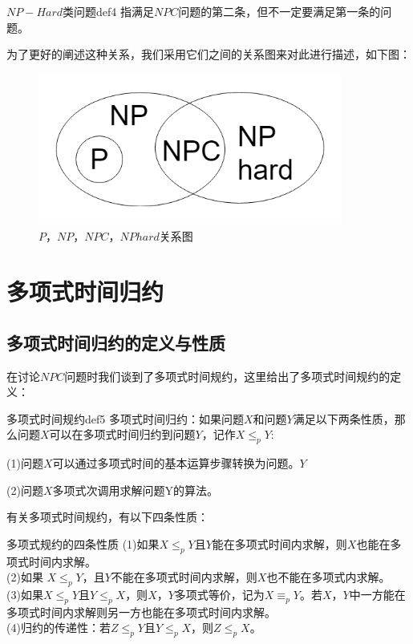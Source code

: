 	\begin{definition}{$NP-Hard$类问题}{def4}
		指满足$NPC$问题的第二条，但不一定要满足第一条的问题。
	\end{definition}
	
	为了更好的阐述这种关系，我们采用它们之间的关系图来对此进行描述，如下图：
	
	\begin{figure}[ht]
		\begin{minipage}[t]{1\linewidth}
			\centering
			\includegraphics[width=10cm,height=5cm]{image/P_NP1.png}
			\caption{$P$，$NP$，$NPC$，$NPhard$关系图}
		\end{minipage}
	\end{figure}
	
	\section{多项式时间归约}
	\subsection{多项式时间归约的定义与性质}
	在讨论$NPC$问题时我们谈到了多项式时间规约，这里给出了多项式时间规约的定义：
	\begin{definition}{多项式时间规约}{def5}
	多项式时间归约：如果问题$X$和问题$Y$满足以下两条性质，那么问题$X$可以在多项式时间归约到问题$Y$，记作$X\leq_pY$:
		
	(1)问题$X$可以通过多项式时间的基本运算步骤转换为问题。$Y$
	
	(2)问题$X$多项式次调用求解问题Y的算法。
	\end{definition}
	有关多项式时间规约，有以下四条性质：
	\begin{theorem}{多项式规约的四条性质}{}
		(1)如果$X\leq_pY$且$Y$能在多项式时间内求解，则$X$也能在多项式时间内求解。\\
		(2)如果 $X\leq_pY$，且$Y$不能在多项式时间内求解，则$X$也不能在多项式内求解。\\
		(3)如果$X\leq_pY$且$Y\leq_pX$，则$X$，$Y$多项式等价，记为$X\equiv_pY$。若$X$，$Y$中一方能在多项式时间内求解则另一方也能在多项式时间内求解。\\
		(4)归约的传递性：若$Z\leq_pY$且$Y\leq_pX$，则$Z\leq_pX$。
	\end{theorem}

